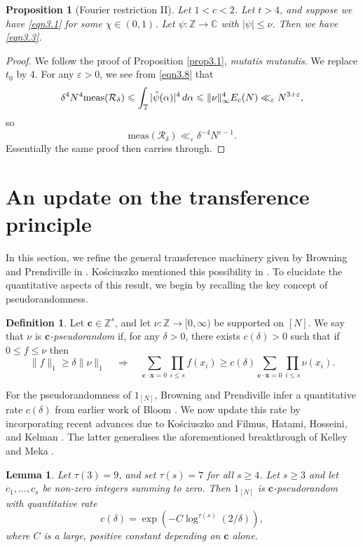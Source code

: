 \documentclass[12pt, reqno]{amsart}
\newtheorem{lemma}[thm]{Lemma}
\newtheorem{prop}[thm]{Proposition}
\theoremstyle{definition}
\newtheorem{defn}[thm]{Definition}
\theoremstyle{remark}
\numberwithin{equation}{section}
\theoremstyle{definition}
\def\alp{{\alpha}} \def\bfalp{{\boldsymbol \alpha}}
\def\del{{\delta}} \def\Del{{\Delta}}
\def\eps{\varepsilon}
\def\le{\leqslant} \def\ge{\geqslant} \def\pleq{\preccurlyeq} \def\ple{\prec}
\def\d{{\,{\rm d}}}
\def \bC {\mathbb C}
\def \bZ {\mathbb Z}
\def \bT {\mathbb T}
\def \bc {\mathbf c}
\def \bx {\mathbf x}
\def \cR {\mathcal R}
\def \meas {\mathrm{meas}}
\begin{document}
\begin{prop}[Fourier restriction II]\label{prop3.2}
Let $1 < c < 2$.
Let $t > 4$, and suppose we have \eqref{eqn3.1} for some $\chi \in (0,1)$. Let $\psi: \bZ \to \bC$ with $|\psi| \le \nu$. Then we have \eqref{eqn3.3}.
\end{prop}

\begin{proof} We follow the proof of Proposition \ref{prop3.1}, \emph{mutatis mutandis}. We replace $t_0$ by 4. For any $\eps>0$, we see from \eqref{eqn3.8} that
\[
\del^4 N^4 \meas(\cR_\del) \le \int_\bT |\hat \psi(\alp)|^4 \d \alp \le \| \nu \|_\infty^4 E_c(N) \ll_\eps N^{3+\eps},
\]
so
\[
\meas(\cR_\del) \ll_\eps \del^{-4} N^{\eps-1}.
\]
Essentially the same proof then carries through.
\end{proof}

\section{An update on the transference principle}
\label{sec4}

In this section, we refine the general transference machinery given by Browning and Prendiville in \cite[Proposition 2.8]{BP2017}. Ko\'sciuszko mentioned this possibility in \cite{Kos}.
To elucidate the quantitative aspects of this result, we begin by recalling the key concept of pseudorandomness.

\begin{defn} Let $\bc \in \bZ^s$, and let $\nu: \bZ \to [0,\infty)$ be supported on $[N]$. We say that $\nu$ is \emph{$\bc$-pseudorandom} if, for any $\del > 0$, there exists $c(\del) > 0$ such that if $0 \le f \le \nu$ then
\[
\| f \|_1 \ge \del \| \nu \|_1 \quad \Longrightarrow \quad
\sum_{\bc \cdot \bx = 0} \prod_{i \le s} f(x_i) \ge c(\del) \sum_{\bc \cdot \bx = 0} \prod_{i \le s} \nu(x_i).
\]
\end{defn}

For the pseudorandomness of $1_{[N]}$, Browning and Prendiville infer a quantitative rate $c(\del)$ from earlier work of Bloom \cite{Blo2012}. We now update this rate by incorporating recent advances due to Ko\'sciuszko \cite{Kos} and Filmus, Hatami, Hosseini, and Kelman \cite{FHHK2024}. The latter generalises the aforementioned breakthrough of Kelley and Meka \cite{KM2023}.

\begin{lemma}
\label{lem4.2}
Let $\tau(3)=9$, and set $\tau(s)=7$ for all $s\geqslant 4$. Let $s \ge 3$ and let $c_1, \ldots, c_s$ be non-zero integers summing to zero. Then $1_{[N]}$ is $\bc$-pseudorandom with quantitative rate
\[
c(\del) = \exp(-C \log^{\tau(s)}(2/\del)),
\]
where $C$ is a large, positive constant depending on $\bc$ alone.
\end{lemma}
\end{document}
